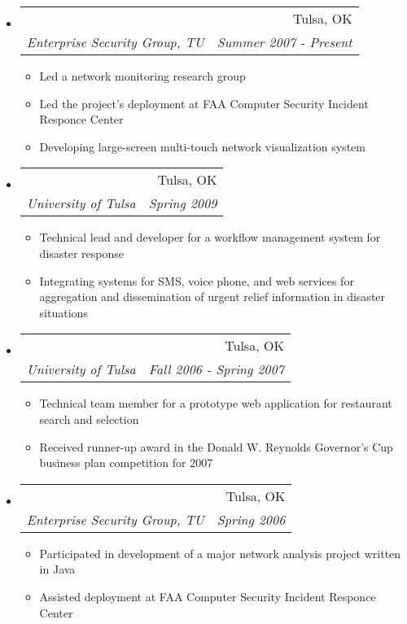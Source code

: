 \documentclass[letterpaper,11pt]{article}
\makeatletter
\newcommand{\resitem}[1]{\item #1 \vspace{-2pt}}
\newcommand{\ressubheading}[4]{
\begin{tabular*}{6.5in}{l@{\extracolsep{\fill}}r}
		\textbf{\parbox{5in}{\raggedright #1 }} & #2 \\
		\textit{#3} & \textit{#4} \\
\end{tabular*}\vspace{-6pt}}
\makeatother
\begin{document}
\begin{itemize}
\item
	\ressubheading{SAND/DVNE}{Tulsa, OK}{Enterprise Security Group, TU}{Summer 2007 - Present}
	\begin{itemize}
		\resitem{Led a network monitoring research group}
		\resitem{Led the project's deployment at FAA Computer Security Incident Responce Center}
		\resitem{Developing large-screen multi-touch network visualization system}
	\end{itemize}
\item
	\ressubheading{Disastro}{Tulsa, OK}{University of Tulsa}{Spring 2009}
	\begin{itemize}
		\resitem{Technical lead and developer for a workflow management system for disaster response}
		\resitem{Integrating systems for SMS, voice phone, and web services for aggregation and dissemination of urgent relief information in disaster situations}
	\end{itemize}
\item
	\ressubheading{Lunchman}{Tulsa, OK}{University of Tulsa}{Fall 2006 - Spring 2007}
	\begin{itemize}
		\resitem{Technical team member for a prototype web application for restaurant search and selection}
		\resitem{Received runner-up award in the Donald W. Reynolds Governor's Cup business plan competition for 2007}
	\end{itemize}
\item
	\ressubheading{NOVA}{Tulsa, OK}{Enterprise Security Group, TU}{Spring 2006}
	\begin{itemize}
		\resitem{Participated in development of a major network analysis project written in Java}
		\resitem{Assisted deployment at FAA Computer Security Incident Responce Center}
	\end{itemize}
\end{itemize}
\end{document}
